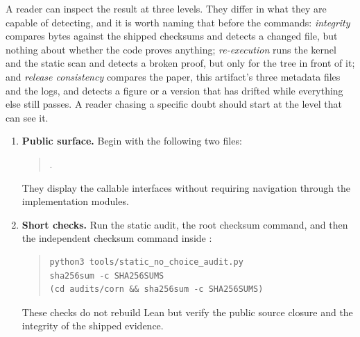 \documentclass[11pt]{article}
\theoremstyle{definition}
\theoremstyle{remark}
\begin{document}
A reader can inspect the result at three levels.  They differ in what they are
capable of detecting, and it is worth naming that before the commands: \emph{integrity}
compares bytes against the shipped checksums and detects a changed file, but nothing
about whether the code proves anything; \emph{re-execution} runs the kernel and the
static scan and detects a broken proof, but only for the tree in front of it; and
\emph{release consistency} compares the paper, this artifact's three metadata files
and the logs, and detects a figure or a version that has drifted while everything
else still passes.  A reader chasing a specific doubt should start at the level that
can see it.

\begin{enumerate}[label=(\arabic*)]
\item \textbf{Public surface.}  Begin with the following two files:
\begin{quote}\small\raggedright
{}\par
{}.
\end{quote}
They display the callable interfaces without requiring navigation through the implementation modules.

\item \textbf{Short checks.}  Run the static audit, the root checksum command, and then the independent checksum command inside :
\begin{quote}
\begin{verbatim}
python3 tools/static_no_choice_audit.py
sha256sum -c SHA256SUMS
(cd audits/corn && sha256sum -c SHA256SUMS)
\end{verbatim}
\end{quote}
These checks do not rebuild Lean but verify the public source closure and the integrity of the shipped evidence.


\end{enumerate}
\end{document}
